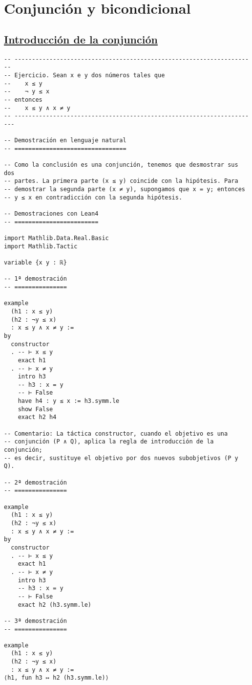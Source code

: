 \section{Conjunción y bicondicional}
\label{sec:org0972eee}

\subsection{\href{./src/Logica/Introduccion\_de\_la\_conjuncion.lean}{Introducción de la conjunción}}
\label{sec:org35a7388}
\begin{verbatim}
-- ---------------------------------------------------------------------
-- Ejercicio. Sean x e y dos números tales que
--    x ≤ y
--    ¬ y ≤ x
-- entonces
--    x ≤ y ∧ x ≠ y
-- ----------------------------------------------------------------------

-- Demostración en lenguaje natural
-- ================================

-- Como la conclusión es una conjunción, tenemos que desmostrar sus dos
-- partes. La primera parte (x ≤ y) coincide con la hipótesis. Para
-- demostrar la segunda parte (x ≠ y), supongamos que x = y; entonces
-- y ≤ x en contradicción con la segunda hipótesis.

-- Demostraciones con Lean4
-- ========================

import Mathlib.Data.Real.Basic
import Mathlib.Tactic

variable {x y : ℝ}

-- 1ª demostración
-- ===============

example
  (h1 : x ≤ y)
  (h2 : ¬y ≤ x)
  : x ≤ y ∧ x ≠ y :=
by
  constructor
  . -- ⊢ x ≤ y
    exact h1
  . -- ⊢ x ≠ y
    intro h3
    -- h3 : x = y
    -- ⊢ False
    have h4 : y ≤ x := h3.symm.le
    show False
    exact h2 h4

-- Comentario: La táctica constructor, cuando el objetivo es una
-- conjunción (P ∧ Q), aplica la regla de introducción de la conjunción;
-- es decir, sustituye el objetivo por dos nuevos subobjetivos (P y Q).

-- 2ª demostración
-- ===============

example
  (h1 : x ≤ y)
  (h2 : ¬y ≤ x)
  : x ≤ y ∧ x ≠ y :=
by
  constructor
  . -- ⊢ x ≤ y
    exact h1
  . -- ⊢ x ≠ y
    intro h3
    -- h3 : x = y
    -- ⊢ False
    exact h2 (h3.symm.le)

-- 3ª demostración
-- ===============

example
  (h1 : x ≤ y)
  (h2 : ¬y ≤ x)
  : x ≤ y ∧ x ≠ y :=
⟨h1, fun h3 ↦ h2 (h3.symm.le)⟩


\end{verbatim}
